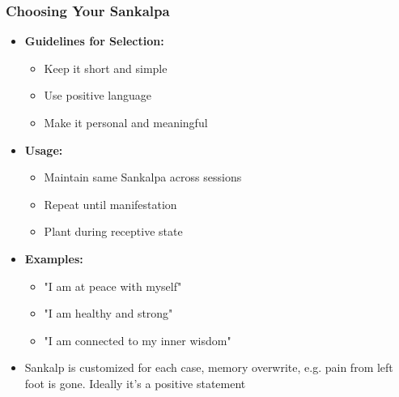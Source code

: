 \begin{frame}[fragile]\frametitle{Choosing Your Sankalpa}
    \begin{itemize}
        \item \textbf{Guidelines for Selection:}
        \begin{itemize}
            \item Keep it short and simple
            \item Use positive language
            \item Make it personal and meaningful
        \end{itemize}
        \item \textbf{Usage:}
        \begin{itemize}
            \item Maintain same Sankalpa across sessions
            \item Repeat until manifestation
            \item Plant during receptive state
        \end{itemize}
        \item \textbf{Examples:}
        \begin{itemize}
            \item "I am at peace with myself"
            \item "I am healthy and strong"
            \item "I am connected to my inner wisdom"
        \end{itemize}
		\item Sankalp is customized for each case, memory overwrite, e.g. pain from left foot is gone. Ideally it's a positive statement 
    \end{itemize}
\end{frame}

